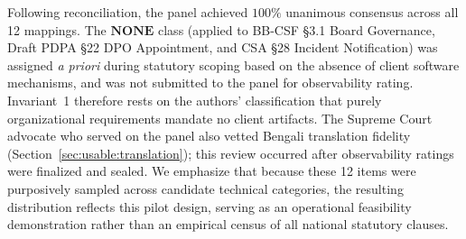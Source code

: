 Following reconciliation, the panel achieved $100\%$ unanimous consensus across all 12 mappings. The $\mathbf{NONE}$ class (applied to BB-CSF §3.1 Board Governance, Draft PDPA §22 DPO Appointment, and CSA §28 Incident Notification) was assigned \textit{a priori} during statutory scoping based on the absence of client software mechanisms, and was not submitted to the panel for observability rating. Invariant~1 therefore rests on the authors' classification that purely organizational requirements mandate no client artifacts. The Supreme Court advocate who served on the panel also vetted Bengali translation fidelity (Section~\ref{sec:usable:translation}); this review occurred after observability ratings were finalized and sealed. We emphasize that because these 12 items were purposively sampled across candidate technical categories, the resulting distribution reflects this pilot design, serving as an operational feasibility demonstration rather than an empirical census of all national statutory clauses.

